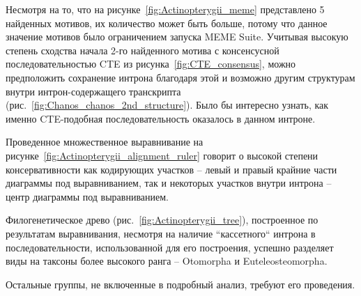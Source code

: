 Несмотря на то, что на рисунке~\ref{fig:Actinopterygii_meme} представлено 5 найденных мотивов, их количество может быть больше, потому что данное значение мотивов было ограничением запуска MEME Suite.
Учитывая высокую степень сходства начала 2-го найденного мотива с консенсусной последовательностью CTE из рисунка~\ref{fig:CTE_consensus}, можно предположить сохранение интрона благодаря этой и возможно другим структурам внутри интрон-содержащего транскрипта (рис.~\ref{fig:Chanos_chanos_2nd_structure}).
Было бы интересно узнать, как именно CTE-подобная последовательность оказалось в данном интроне.

Проведенное множественное выравнивание на рисунке~\ref{fig:Actinopterygii_alignment_ruler} говорит о высокой степени консервативности как кодирующих участков – левый и правый крайние части диаграммы под выравниванием, так и некоторых участков внутри интрона – центр диаграммы под выравниванием.

Филогенетическое древо (рис.~\ref{fig:Actinopterygii_tree}), построенное по результатам выравнивания, несмотря на наличие ``кассетного`` интрона в последовательности, использованной для его построения, успешно разделяет виды на таксоны более высокого ранга – Otomorpha и Euteleosteomorpha.

Остальные группы, не включенные в подробный анализ, требуют его проведения.